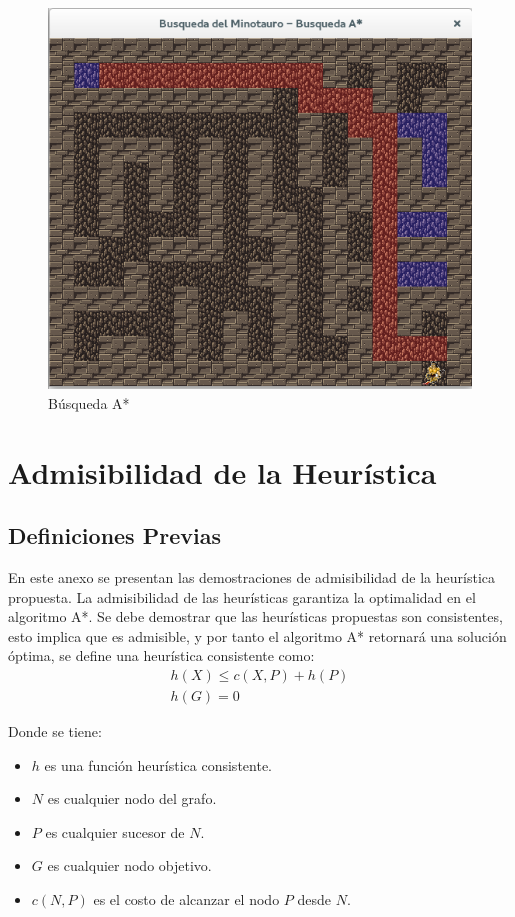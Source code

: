 \documentclass[letter, titlepage, 10pt]{article}
\begin{document}
\begin{appendices}
  \begin{figure}[H]
    \begin{center}
        \includegraphics[scale = 0.4]{images/bae_03}
        \caption{Búsqueda A*}
    \end{center}
\end{figure}
    
    \newpage

  \section{Admisibilidad de la Heurística}
  \subsection{Definiciones Previas}
    En este anexo se presentan las demostraciones de admisibilidad de la heurística propuesta. La admisibilidad de las heurísticas garantiza la optimalidad en el algoritmo A*.
    Se debe demostrar que las heurísticas propuestas son consistentes, esto implica que es admisible, y por tanto el algoritmo A* retornará una solución óptima, se define una heurística consistente como:
\begin{align*}
h(X) \leq c(X,P) + h(P)\\
h(G) = 0
\end{align*}

Donde se tiene:
\begin{itemize}
\item $h$ es una función heurística consistente.
\item $N$ es cualquier nodo del grafo.
\item $P$ es cualquier sucesor de $N$.
\item $G$ es cualquier nodo objetivo.
\item $c(N,P)$ es el costo de alcanzar el nodo $P$ desde $N$.
\end{itemize}


\end{appendices}
\end{document}
